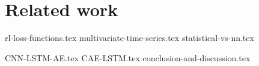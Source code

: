 
\chapter{Related work}\label{RelatedWorkMain}

{rl-loss-functions.tex}
{multivariate-time-series.tex}
{statistical-vs-nn.tex}

{CNN-LSTM-AE.tex}
{CAE-LSTM.tex}
{conclusion-and-discussion.tex}